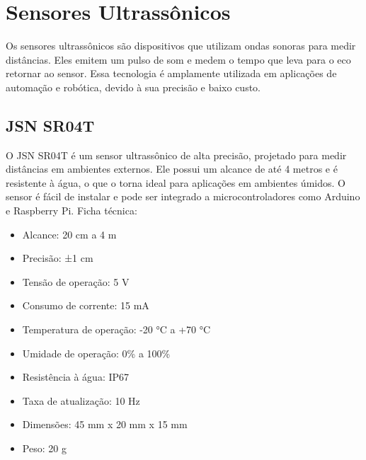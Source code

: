 


\section{Sensores Ultrassônicos}
Os sensores ultrassônicos são dispositivos que utilizam ondas sonoras para medir distâncias. Eles emitem um pulso de som e medem o tempo que leva para o eco retornar ao sensor. Essa tecnologia é amplamente utilizada em aplicações de automação e robótica, devido à sua precisão e baixo custo.

\subsection{JSN SR04T}
O JSN SR04T é um sensor ultrassônico de alta precisão, projetado para medir distâncias em ambientes externos. Ele possui um alcance de até 4 metros e é resistente à água, o que o torna ideal para aplicações em ambientes úmidos. O sensor é fácil de instalar e pode ser integrado a microcontroladores como Arduino e Raspberry Pi.
Ficha técnica:
\begin{itemize}
	\item Alcance: 20 cm a 4 m
	\item Precisão: ±1 cm
	\item Tensão de operação: 5 V
	\item Consumo de corrente: 15 mA
	\item Temperatura de operação: -20 °C a +70 °C
	\item Umidade de operação: 0\% a 100\%
	\item Resistência à água: IP67
	\item Taxa de atualização: 10 Hz
	\item Dimensões: 45 mm x 20 mm x 15 mm
	\item Peso: 20 g
\end{itemize}

